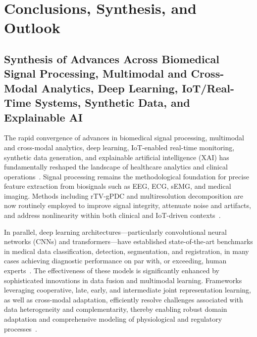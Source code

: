 \section{Conclusions, Synthesis, and Outlook}

\subsection{Synthesis of Advances Across Biomedical Signal Processing, Multimodal and Cross-Modal Analytics, Deep Learning, IoT/Real-Time Systems, Synthetic Data, and Explainable AI}

The rapid convergence of advances in biomedical signal processing, multimodal and cross-modal analytics, deep learning, IoT-enabled real-time monitoring, synthetic data generation, and explainable artificial intelligence (XAI) has fundamentally reshaped the landscape of healthcare analytics and clinical operations~\cite{ref16,ref17,ref18,ref19,ref20,ref21,ref22,ref23,ref24,ref25,ref28,ref29,ref30,ref31,ref32,ref33,ref34,ref35,ref36,ref37,ref38,ref39,ref40,ref41,ref42,ref43,ref44,ref45,ref46,ref47,ref48,ref49,ref50,ref51,ref52,ref53,ref54,ref55,ref56,ref57,ref58,ref59,ref60,ref61,ref62,ref63,ref64,ref65,ref66,ref67,ref68,ref69,ref70,ref71,ref72,ref73,ref74,ref75,ref76,ref77,ref78,ref79,ref80,ref81,ref82,ref83,ref84,ref85,ref86,ref87,ref88,ref89,ref90,ref91,ref92,ref94,ref95,ref96,ref97,ref98,ref99,ref100,ref101,ref102,ref103,ref104,ref105,ref106,ref107}. Signal processing remains the methodological foundation for precise feature extraction from biosignals such as EEG, ECG, sEMG, and medical imaging. Methods including rTV-gPDC and multiresolution decomposition are now routinely employed to improve signal integrity, attenuate noise and artifacts, and address nonlinearity within both clinical and IoT-driven contexts~\cite{ref16,ref17,ref19}. 

In parallel, deep learning architectures---particularly convolutional neural networks (CNNs) and transformers---have established state-of-the-art benchmarks in medical data classification, detection, segmentation, and registration, in many cases achieving diagnostic performance on par with, or exceeding, human experts~\cite{ref40,ref43,ref44,ref49,ref54,ref57,ref60,ref63}. The effectiveness of these models is significantly enhanced by sophisticated innovations in data fusion and multimodal learning. Frameworks leveraging cooperative, late, early, and intermediate joint representation learning, as well as cross-modal adaptation, efficiently resolve challenges associated with data heterogeneity and complementarity, thereby enabling robust domain adaptation and comprehensive modeling of physiological and regulatory processes~\cite{ref30,ref31,ref32,ref33,ref34,ref35,ref36,ref37,ref39,ref41,ref47,ref48,ref51,ref64,ref65}.

